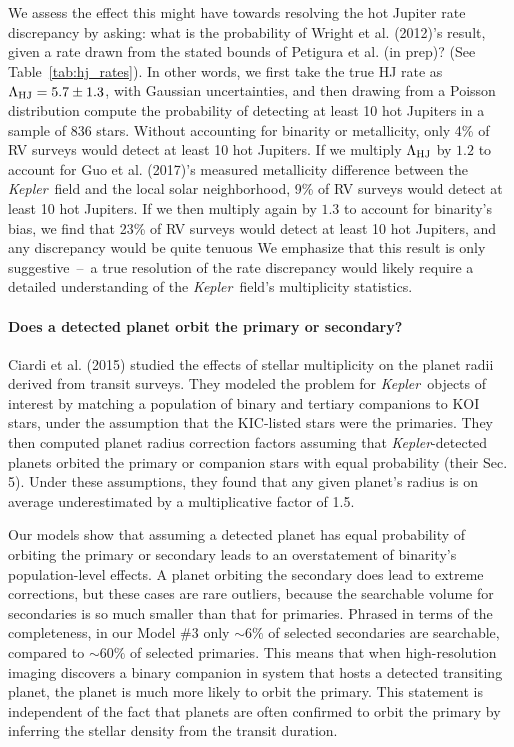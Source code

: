 We assess the effect this might have towards resolving the hot Jupiter rate 
discrepancy by asking:
what is the probability of Wright et al. (2012)'s result, given a rate drawn 
from the stated bounds of Petigura et al. (in prep)? (See 
Table~\ref{tab:hj_rates}).
In other words, we first take the true HJ rate as $\Lambda_{\rm HJ} = 5.7 \pm 
1.3$, with Gaussian uncertainties, and then drawing from a Poisson 
distribution compute the probability of detecting at least 10 hot Jupiters in 
a sample of 836 stars.
Without accounting for binarity or metallicity, only 4\% of RV surveys would 
detect at least 10 hot Jupiters.
If we multiply $\Lambda_{\rm HJ}$ by $1.2$ to account for Guo et al. 
(2017)'s measured metallicity difference between the {\it Kepler}\ field and 
the local solar neighborhood, 9\% of RV surveys would detect at least 10 hot 
Jupiters.
If we then multiply again by $1.3$ to account for binarity's bias, we find that
23\% of RV surveys would detect at least 10 hot Jupiters, and any discrepancy 
would be quite tenuous
We emphasize that this result is only suggestive~--~a true resolution of the 
rate discrepancy would likely require a detailed understanding of the {\it 
Kepler}\ field's multiplicity statistics.



\paragraph{Does a detected planet orbit the primary or secondary?}
Ciardi et al. (2015) studied the effects of stellar multiplicity on the 
planet radii derived from transit surveys.
They modeled the problem for {\it Kepler}\ objects of interest by matching a 
population of binary and tertiary companions to KOI stars, 
under the assumption that the KIC-listed stars were the primaries.
They then computed planet radius correction factors assuming that {\it 
Kepler}-detected planets orbited the primary or companion stars
with equal probability (their Sec. 5).
Under these assumptions, they found that any given planet's radius is on 
average underestimated by a multiplicative factor of 1.5.

Our models show that assuming a detected planet has equal probability of 
orbiting the primary or secondary leads to an overstatement of
binarity's population-level effects.
A planet orbiting the secondary does lead to extreme corrections, but these 
cases are rare outliers, because the searchable volume for secondaries is so 
much smaller than that for primaries.
Phrased in terms of the completeness, in our Model \#3 only $\sim 6\%$ of 
selected secondaries are searchable, compared to $\sim 60\%$ of selected 
primaries.
This means that when high-resolution imaging discovers a binary companion in 
system that hosts a detected transiting planet, the planet is much
more likely to orbit the primary.
This statement is independent of the fact that planets are often confirmed to 
orbit the primary by inferring the stellar density from the transit duration.


